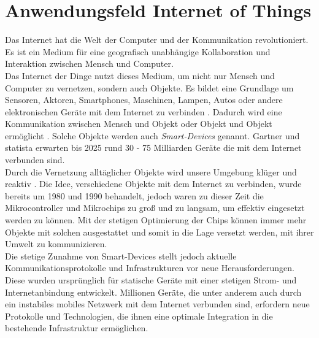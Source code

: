 \section{Anwendungsfeld Internet of Things} \label{s:domain}
Das Internet hat die Welt der Computer und der Kommunikation revolutioniert. Es ist ein Medium für eine geografisch unabhängige Kollaboration und Interaktion zwischen Mensch und Computer.
\cite{BriefHistoryInternet}
\\
Das Internet der Dinge nutzt dieses Medium, um nicht nur Mensch und Computer zu vernetzen, sondern auch Objekte.
Es bildet eine Grundlage um Sensoren, Aktoren, Smartphones, Maschinen, Lampen, Autos oder andere elektronischen Geräte mit dem Internet zu verbinden \cite{morganSimpleExplanationInternet}.
Dadurch wird eine Kommunikation zwischen Mensch und Objekt oder Objekt und Objekt ermöglicht \cite{uckelmannArchitectingInternetThings2011}.
Solche Objekte werden auch \textit{Smart-Devices} genannt.
Gartner \cite{hungGartnerInsightsHow} und statista \cite{GlobalIoTNonIoT} erwarten bis 2025 rund 30 - 75 Milliarden Geräte die mit dem Internet verbunden sind.
\\
Durch die Vernetzung alltäglicher Objekte wird unsere Umgebung klüger und reaktiv \cite{rangerWhatIoTEverything}.
Die Idee, verschiedene Objekte mit dem Internet zu verbinden, wurde bereits um 1980 und 1990 behandelt, jedoch waren zu dieser Zeit die Mikrocontroller und Mikrochips zu gro{\ss} und zu langsam, um effektiv eingesetzt werden zu können.
Mit der stetigen Optimierung der Chips können immer mehr Objekte mit solchen ausgestattet und somit in die Lage versetzt werden, mit ihrer Umwelt zu kommunizieren.
\cite{rangerWhatIoTEverything}
\\
Die stetige Zunahme von Smart-Devices stellt jedoch aktuelle Kommunikationsprotokolle und Infrastrukturen vor neue Herausforderungen.
Diese wurden ursprünglich für statische Geräte mit einer stetigen Strom- und Internetanbindung entwickelt. Millionen Geräte, die unter anderem auch durch ein instabiles mobiles Netzwerk mit dem Internet verbunden sind, erfordern neue Protokolle und Technologien, die ihnen eine optimale Integration in die bestehende Infrastruktur ermöglichen.
\cite{uckelmannArchitectingInternetThings2011}
\newpage

\begin{comment}
- Describe the (business) domain of your work. Ask yourself: What does the common reader need to know about the domain in order to understand the results of your work? For example, if you work contributes to the claim handling process of some insurance company, describe the common claim handling process.
- Please refrain from meandering explanations about details that have no relevance for later chapters (just in order to increase your page count).
- The header "Domain / Anwendungsfeld" is supposed to be replaced or extended with some more specific header like: "Domain 'Claim handling'"
\end{comment}
